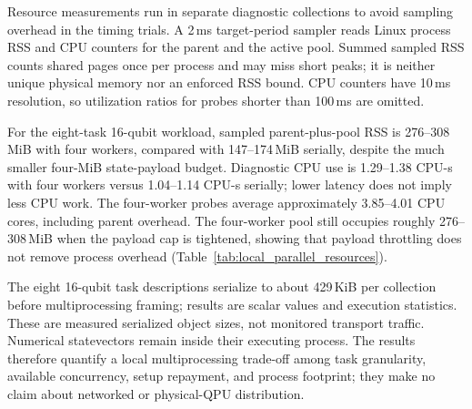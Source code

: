 Resource measurements run in separate diagnostic collections to avoid sampling overhead in the timing trials. A 2\,ms target-period sampler reads Linux process RSS and CPU counters for the parent and the active pool. Summed sampled RSS counts shared pages once per process and may miss short peaks; it is neither unique physical memory nor an enforced RSS bound. CPU counters have 10\,ms resolution, so utilization ratios for probes shorter than 100\,ms are omitted.

For the eight-task 16-qubit workload, sampled parent-plus-pool RSS is 276--308\,MiB with four workers, compared with 147--174\,MiB serially, despite the much smaller four-MiB state-payload budget. Diagnostic CPU use is 1.29--1.38 CPU-s with four workers versus 1.04--1.14 CPU-s serially; lower latency does not imply less CPU work. The four-worker probes average approximately 3.85--4.01 CPU cores, including parent overhead. The four-worker pool still occupies roughly 276--308\,MiB when the payload cap is tightened, showing that payload throttling does not remove process overhead (Table~\ref{tab:local_parallel_resources}).

The eight 16-qubit task descriptions serialize to about 429\,KiB per collection before multiprocessing framing; results are scalar values and execution statistics. These are measured serialized object sizes, not monitored transport traffic. Numerical statevectors remain inside their executing process. The results therefore quantify a local multiprocessing trade-off among task granularity, available concurrency, setup repayment, and process footprint; they make no claim about networked or physical-QPU distribution.
